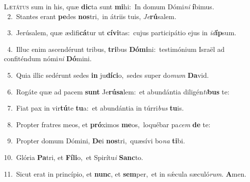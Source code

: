 \lettrine{\initial\textcolor{\initialcolor}{L}}{ætátus} sum in his, quæ \textbf{dic}\-ta sunt \textbf{mi}\-hi:~\star In domum Dómi\textit{ni} \textbf{í}\-bimus.\\
{\numbfont\textcolor{\numbcolor}{~2.}}~Stantes erant \textbf{pe}\-des \textbf{nos}\-tri,~\star in átriis tuis, \textit{Je}\-\textbf{rú}salem.\par
{\numbfont\textcolor{\numbcolor}{~3.}}~Jerúsalem, quæ ædifi\-\textbf{cá}\-tur ut \textbf{cí}\-\textbf{vi}tas:~\star cujus participátio ejus in \textit{id}\-\textbf{íp}sum.\par
{\numbfont\textcolor{\numbcolor}{~4.}}~Illuc enim ascendérunt tribus, \textbf{tri}\-bus \textbf{Dó}\-\textbf{mi}ni:~\star testimónium Israël ad confiténdum nómi\textit{ni} \textbf{Dó}\-mini.\par
{\numbfont\textcolor{\numbcolor}{~5.}}~Quia illic sedérunt sedes \textbf{in} ju\-\textbf{dí}\-\textbf{ci}o,~\star sedes super do\textit{mum} \textbf{Da}\-vid.\par
{\numbfont\textcolor{\numbcolor}{~6.}}~Rogáte quæ ad pacem \textbf{sunt} Je\-\textbf{rú}\-\textbf{sa}lem:~\star et abundántia diligén\-\textit{ti}\-\textbf{bus} te:\par
{\numbfont\textcolor{\numbcolor}{~7.}}~Fiat pax in vir\-\textbf{tú}\-te \textbf{tu}\-a:~\star et abundántia in túrri\textit{bus} \textbf{tu}\-is.\par
{\numbfont\textcolor{\numbcolor}{~8.}}~Propter fratres meos, et \textbf{pró}\-ximos \textbf{me}\-os,~\star loquébar pa\textit{cem} \textbf{de} te:\par
{\numbfont\textcolor{\numbcolor}{~9.}}~Propter domum Dómini, \textbf{De}\-i \textbf{nos}\-tri,~\star quæsívi bo\textit{na} \textbf{ti}\-bi.\par
{\numbfont\textcolor{\numbcolor}{10.}}~Glória \textbf{Pa}\-tri, et \textbf{Fí}\-\textbf{li}o,~\star et Spirítu\textit{i} \textbf{Sanc}\-to.\par
{\numbfont\textcolor{\numbcolor}{11.}}~Sicut erat in princípio, et \textbf{nunc}\-, et \textbf{sem}\-per,~\star et in sǽcula sæculó\-\textit{rum}\-. \textbf{A}\-men.\par
